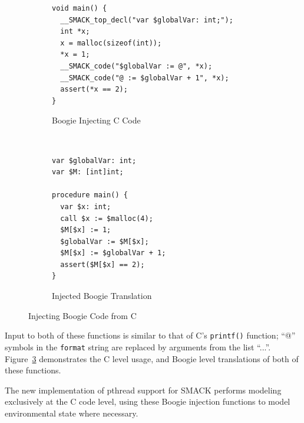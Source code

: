 \begin{figure}[!ht]
\centering
\begin{subfigure}[b]{1\textwidth}
\centering
\begin{lstlisting}
void main() {
  __SMACK_top_decl("var $globalVar: int;");
  int *x;
  x = malloc(sizeof(int));
  *x = 1;
  __SMACK_code("$globalVar := @", *x);
  __SMACK_code("@ := $globalVar + 1", *x);
  assert(*x == 2);
}
\end{lstlisting}
\caption{Boogie Injecting C Code}\label{fig:cinjToBoogie_a}
\end{subfigure}
~
\begin{subfigure}[b]{1\textwidth}
\centering
\begin{lstlisting}[language=boogie]
var $globalVar: int;
var $M: [int]int;

procedure main() {
  var $x: int;
  call $x := $malloc(4);
  $M[$x] := 1;
  $globalVar := $M[$x];
  $M[$x] := $globalVar + 1;
  assert($M[$x] == 2);
}
\end{lstlisting}
\caption{Injected Boogie Translation}\label{fig:cinjToBoogie_b}
\end{subfigure}
\caption{Injecting Boogie Code from C}\label{fig:cinjToBoogie}
\end{figure}

Input to both of these functions is similar to that of C's
\lstinline|printf()| function; ``@'' symbols in the
\lstinline|format| string are replaced by arguments from the list
``...''.  Figure~\ref{fig:cinjToBoogie} demonstrates the C level usage,
and Boogie level translations of both of these functions.

The new implementation of pthread support for SMACK performs modeling
exclusively at the C code level, using these Boogie injection 
functions to model environmental state where necessary.

